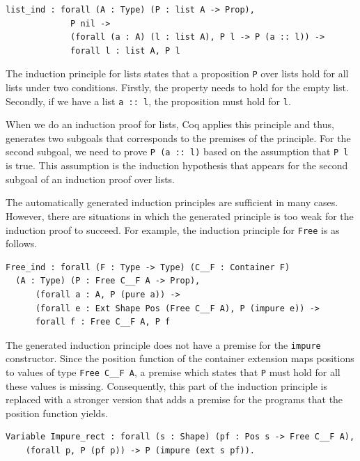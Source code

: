 \documentclass[a4paper, 11pt, fleqn, twoside, abstract=on]{scrreprt}
\newcommand{\cinl}[1]{\texttt{#1}}
\begin{document}
\begin{verbatim}
list_ind : forall (A : Type) (P : list A -> Prop),
             P nil ->
             (forall (a : A) (l : list A), P l -> P (a :: l)) ->
             forall l : list A, P l
\end{verbatim}

The induction principle for lists states that a proposition \cinl{P} over lists hold for all lists under two conditions.
Firstly, the property needs to hold for the empty list.
Secondly, if we have a list \cinl{a :: l}, the proposition must hold for \cinl{l}.

When we do an induction proof for lists, Coq applies this principle and thus, generates two subgoals that corresponds to the premises of the principle.
For the second subgoal, we need to prove \cinl{P (a :: l)} based on the assumption that \cinl{P l} is true.
This assumption is the induction hypothesis that appears for the second subgoal of an induction proof over lists.

The automatically generated induction principles are sufficient in many cases.
However, there are situations in which the generated principle is too weak for the induction proof to succeed.
For example, the induction principle for \cinl{Free} is as follows.

\begin{verbatim}
Free_ind : forall (F : Type -> Type) (C__F : Container F) 
  (A : Type) (P : Free C__F A -> Prop),
      (forall a : A, P (pure a)) -> 
      (forall e : Ext Shape Pos (Free C__F A), P (impure e)) -> 
      forall f : Free C__F A, P f
\end{verbatim}

The generated induction principle does not have a premise for the \cinl{impure} constructor.
Since the position function of the container extension maps positions to values of type \cinl{Free C__F A}, a premise which states that \cinl{P} must hold for all these values is missing.
Consequently, this part of the induction principle is replaced with a stronger version that adds a premise for the programs that the position function yields.

\begin{verbatim}
Variable Impure_rect : forall (s : Shape) (pf : Pos s -> Free C__F A),
    (forall p, P (pf p)) -> P (impure (ext s pf)).
\end{verbatim}
\end{document}

